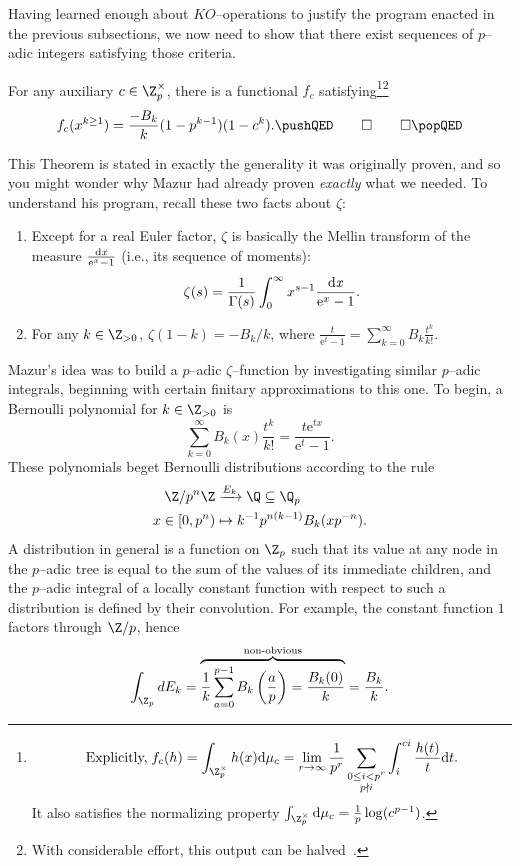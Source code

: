 Having learned enough about \(KO\)--operations to justify the program enacted in the previous subsections, we now need to show that there exist sequences of \(p\)--adic integers satisfying those criteria.

\begin{theorem}[Mazur]
For any auxiliary \(c \in \Z_p^\times\), there is a functional \(f_c\) satisfying\footnote{\[\text{Explicitly,\;} f_c(h) = \int_{\Z_p^\times} h(x) \mathrm d\mu_c = \lim_{r \to \infty} \frac{1}{p^r} \sum_{\substack{0 \le i < p^r \\ p \nmid i}} \int_i^{ci} \frac{h(t)}{t} \mathrm dt.\]  It also satisfies the normalizing property \(\int_{\Z_p^\times} \mathrm d\mu_c = \frac{1}{p} \log(c^{p-1})\).}\footnote{With considerable effort, this output can be halved~\cite[Section 10.3]{AHR}.} \[f_c(x^{k \ge 1}) = \frac{-B_k}{k}(1 - p^{k-1})(1 - c^k).  \pushQED\qed \qedhere \popQED\]
\end{theorem}

\noindent This Theorem is stated in exactly the generality it was originally proven, and so you might wonder why Mazur had already proven \emph{exactly} what we needed.  To understand his program, recall these two facts about \(\zeta\):
\begin{enumerate}
    \item Except for a real Euler factor, \(\zeta\) is basically the Mellin transform of the measure \(\frac{\operatorname{d\mathit{x}}}{\mathrm e^x - 1}\) (i.e., its sequence of moments): \[\zeta(s) = \frac{1}{\Gamma(s)} \int_0^\infty x^{s-1} \frac{\operatorname{d\mathit{x}}}{\mathrm e^x - 1}.\]
    \item For any \(k \in \Z_{> 0}\), \(\zeta(1 - k) = -B_k / k\), where \(\frac{t}{\mathrm e^t - 1} = \sum_{k=0}^\infty B_k \frac{t^k}{k!}\).
\end{enumerate}
Mazur's idea was to build a  \(p\)--adic \(\zeta\)--function by investigating similar \(p\)--adic integrals, beginning with certain finitary approximations to this one.  To begin, a Bernoulli polynomial for \(k \in \Z_{>0}\) is \[\sum_{k=0}^\infty B_k(x) \frac{t^k}{k!} = \frac{t \mathrm e^{tx}}{\mathrm e^t - 1}.\]  These polynomials beget Bernoulli distributions according to the rule
\begin{align*}
\Z/p^n\Z & \xrightarrow{E_k} \Q \subseteq \Q_p \\
x \in [0, p^n) & \mapsto k^{-1} p^{n(k-1)} B_k(x p^{-n}).
\end{align*}
A distribution in general is a function on \(\Z_p\) such that its value at any node in the \(p\)--adic tree is equal to the sum of the values of its immediate children, and the \(p\)--adic integral of a locally constant function with respect to such a distribution is defined by their convolution.  For example, the constant function \(1\) factors through \(\Z/p\), hence \[\int_{\Z_p} dE_k = \overset{\text{non-obvious}}{\overbrace{\frac{1}{k} \sum_{a=0}^{p-1} B_k\left(\frac{a}{p}\right) = \frac{B_k(0)}{k}}} = \frac{B_k}{k}.\]

